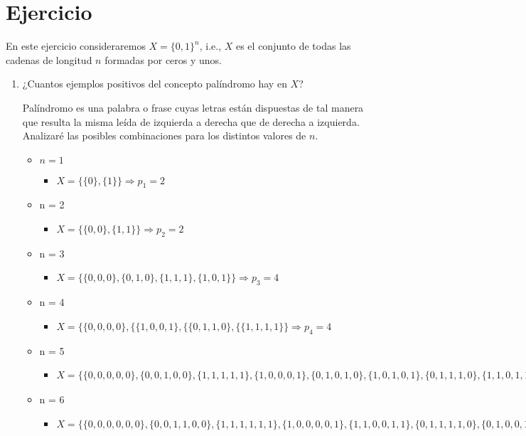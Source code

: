 \documentclass{article}
\begin{document}
\section{Ejercicio}
En este ejercicio consideraremos \(X = \{0, 1\}^n\), i.e., \(X\) es el conjunto de todas las cadenas de longitud \(n\) formadas por ceros
y unos.
\begin{enumerate}
    \item ¿Cuantos ejemplos positivos del concepto palíndromo hay en \(X\)?
    
    Palíndromo es una palabra o frase cuyas letras están dispuestas de tal manera que resulta la misma leída de izquierda a derecha que de derecha a izquierda. Analizaré las posibles combinaciones para los distintos valores de \(n\).
    \begin{itemize}
        \item \(n = 1\)
        \begin{itemize}
            \item \(X = \{\{0\}, \{1\}\} \Rightarrow p_1 =2\)
        \end{itemize}
    \item  n = 2
        \begin{itemize}
            \item \(X = \{\{0,0\}, \{1,1\}\} \Rightarrow p_2 =2\)
        \end{itemize}
    \item n = 3
        \begin{itemize}
            \item \(X = \{\{0,0,0\},\{0,1,0\}, \{1,1,1\}, \{1,0,1\}\} \Rightarrow p_3 =4\)
        \end{itemize}
    \item n = 4
        \begin{itemize}
            \item \(X = \{\{0,0,0,0\}, \{\{1,0,0,1\}, \{\{0,1,1,0\}, \{\{1,1,1,1\}\} \Rightarrow p_4 =4\)
        \end{itemize}
    \item n = 5
        \begin{itemize}
            \item \(X = \{\{0,0,0,0,0\}, \{0,0,1,0,0\}, \{1,1,1,1,1\}, \{1,0,0,0,1\}, \{0,1,0,1,0\}, \{1,0,1,0,1\}, \{0,1,1,1,0\}, \{1,1,0,1,1\}\} \Rightarrow p_5 =8\)
        \end{itemize}
    \item n = 6
        \begin{itemize}
            \item \(X = \{\{0,0,0,0,0,0\}, \{0,0,1,1,0,0\}, \{1,1,1,1,1,1\}, \{1,0,0,0,0,1\}, \{1,1,0,0,1,1\}, \{0,1,1,1,1,0\}, \{0,1,0,0,1,0\},\{1,0,1,1,0,1\}\} \Rightarrow p_6 =8\)

\end{itemize}
\end{itemize}
\end{enumerate}
\end{document}
